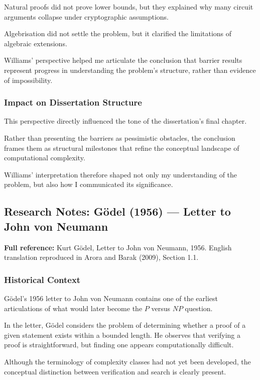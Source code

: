 \documentclass[12pt]{article}
\begin{document}
Natural proofs did not prove lower bounds, but they explained why many circuit arguments collapse under cryptographic assumptions.

Algebrisation did not settle the problem, but it clarified the limitations of algebraic extensions.

Williams' perspective helped me articulate the conclusion that barrier results represent progress in understanding the problem's structure, rather than evidence of impossibility.

\subsubsection*{Impact on Dissertation Structure}

This perspective directly influenced the tone of the dissertation's final chapter.

Rather than presenting the barriers as pessimistic obstacles, the conclusion frames them as structural milestones that refine the conceptual landscape of computational complexity.

Williams' interpretation therefore shaped not only my understanding of the problem, but also how I communicated its significance.

\subsection{Research Notes: Gödel (1956) --- Letter to John von Neumann}

\textbf{Full reference:} Kurt Gödel,
Letter to John von Neumann, 1956.
English translation reproduced in Arora and Barak (2009), Section 1.1.

\subsubsection*{Historical Context}

Gödel's 1956 letter to John von Neumann contains one of the earliest articulations of what would later become the $P$ versus $NP$ question.

In the letter, Gödel considers the problem of determining whether a proof of a given statement exists within a bounded length. He observes that verifying a proof is straightforward, but finding one appears computationally difficult.

Although the terminology of complexity classes had not yet been developed, the conceptual distinction between verification and search is clearly present.
\end{document}
